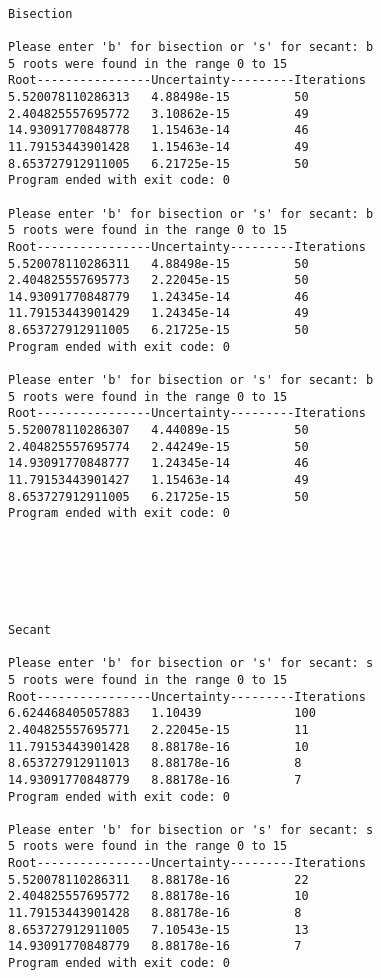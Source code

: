 \documentclass{article}
\begin{document}
\begin{verbatim}

Bisection

Please enter 'b' for bisection or 's' for secant: b
5 roots were found in the range 0 to 15
Root----------------Uncertainty---------Iterations
5.520078110286313   4.88498e-15         50                  
2.404825557695772   3.10862e-15         49                  
14.93091770848778   1.15463e-14         46                  
11.79153443901428   1.15463e-14         49                  
8.653727912911005   6.21725e-15         50                  
Program ended with exit code: 0

Please enter 'b' for bisection or 's' for secant: b
5 roots were found in the range 0 to 15
Root----------------Uncertainty---------Iterations
5.520078110286311   4.88498e-15         50                  
2.404825557695773   2.22045e-15         50                  
14.93091770848779   1.24345e-14         46                  
11.79153443901429   1.24345e-14         49                  
8.653727912911005   6.21725e-15         50                  
Program ended with exit code: 0

Please enter 'b' for bisection or 's' for secant: b
5 roots were found in the range 0 to 15
Root----------------Uncertainty---------Iterations
5.520078110286307   4.44089e-15         50                  
2.404825557695774   2.44249e-15         50                  
14.93091770848777   1.24345e-14         46                  
11.79153443901427   1.15463e-14         49                  
8.653727912911005   6.21725e-15         50                  
Program ended with exit code: 0






Secant

Please enter 'b' for bisection or 's' for secant: s
5 roots were found in the range 0 to 15
Root----------------Uncertainty---------Iterations
6.624468405057883   1.10439             100                 
2.404825557695771   2.22045e-15         11                  
11.79153443901428   8.88178e-16         10                  
8.653727912911013   8.88178e-16         8                   
14.93091770848779   8.88178e-16         7                   
Program ended with exit code: 0

Please enter 'b' for bisection or 's' for secant: s
5 roots were found in the range 0 to 15
Root----------------Uncertainty---------Iterations
5.520078110286311   8.88178e-16         22                  
2.404825557695772   8.88178e-16         10                  
11.79153443901428   8.88178e-16         8                   
8.653727912911005   7.10543e-15         13                  
14.93091770848779   8.88178e-16         7                   
Program ended with exit code: 0


\end{verbatim}
\end{document}
